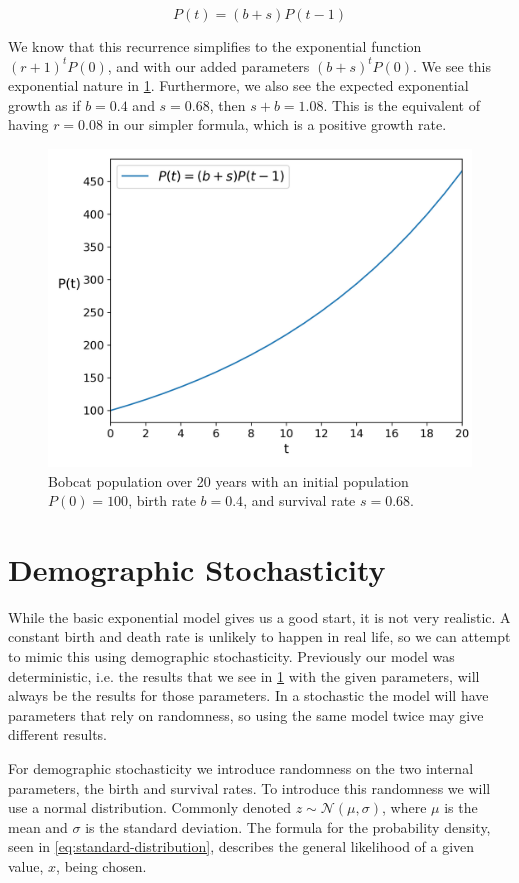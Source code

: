 \documentclass{article}
\begin{document}
\begin{equation} \label{eq:exponential}
    P(t) = (b+s)P(t-1)
\end{equation}

We know that this recurrence simplifies to the exponential function $(r + 1)^tP(0)$, and with our added parameters $(b + s)^tP(0)$. We see this exponential nature in \cref{fig:exponential}. Furthermore, we also see the expected exponential growth as if $b=0.4$ and $s=0.68$, then $s+b = 1.08$. This is the equivalent of having $r = 0.08$ in our simpler formula, which is a positive growth rate.

\begin{figure}
    \centering
    \includegraphics[width=.5\linewidth]{plots/exponential.png}
    \caption{Bobcat population over 20 years with an initial population $P(0)=100$, birth rate $b=0.4$, and survival rate $s=0.68$.}
    \label{fig:exponential}
\end{figure}

\section{Demographic Stochasticity}
While the basic exponential model gives us a good start, it is not very realistic. A constant birth and death rate is unlikely to happen in real life, so we can attempt to mimic this using demographic stochasticity. Previously our model was deterministic, i.e. the results that we see in \cref{fig:exponential} with the given parameters, will always be the results for those parameters. In a stochastic the model will have parameters that rely on randomness, so using the same model twice may give different results.

For demographic stochasticity we introduce randomness on the two internal parameters, the birth and survival rates. To introduce this randomness we will use a normal distribution. Commonly denoted $z \sim \mathcal{N}(\mu, \sigma)$, where $\mu$ is the mean and $\sigma$ is the standard deviation. The formula for the probability density, seen in \cref{eq:standard-distribution}, describes the general likelihood of a given value, $x$, being chosen.
\end{document}
